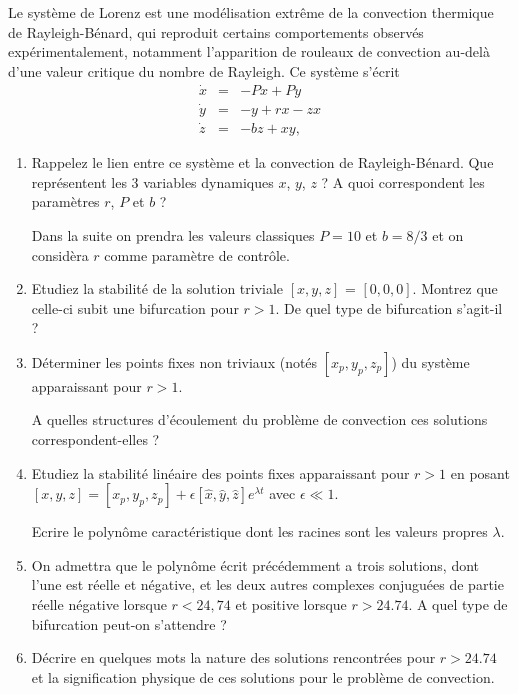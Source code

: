 \documentclass[a4paper,11pt]{article}
\begin{document}
Le système de Lorenz est une modélisation extrême de la convection thermique de Rayleigh-Bénard, qui reproduit certains comportements observés expérimentalement, notamment l'apparition de rouleaux de convection au-delà d'une valeur critique du nombre de Rayleigh. Ce système s'écrit
\begin{eqnarray*}
\dot{x} &=& - P x + P y \\
\dot{y} &=& - y + r x - z x  \\
\dot{z} &=& - b z + x y,
\end{eqnarray*}


\begin{enumerate}

\item Rappelez le lien entre ce système et la convection de Rayleigh-Bénard. Que représentent les 3 variables dynamiques $x$, $y$, $z$ ? A quoi correspondent les
paramètres $r$, $P$ et $b$ ?

Dans la suite on prendra les valeurs classiques $P = 10$ et $b = 8/3$ et on considèra $r$ comme paramètre de contrôle.

\item Etudiez la stabilité de la solution triviale $[x,y,z]$ = $[0,0,0]$. Montrez que celle-ci subit une bifurcation pour $r>1$. De quel type de bifurcation s'agit-il ?

\item Déterminer les points fixes non triviaux (notés $[x_p,y_p,z_p]$) du système apparaissant pour $r>1$. 

A quelles structures d'écoulement du problème de convection ces solutions correspondent-elles ?

\item Etudiez la stabilité linéaire des points fixes apparaissant pour $r>1$ en posant $[x,y,z] = [x_p,y_p,z_p] + \epsilon [\hat{x},\hat{y},\hat{z}] e^{\lambda t}$ 
avec $\epsilon \ll 1$.

Ecrire le polynôme caractéristique dont les racines sont les valeurs propres $\lambda$.

\item On admettra que le polynôme écrit précédemment a trois solutions, dont l'une est réelle et négative, et les deux autres complexes conjuguées de partie réelle négative lorsque $r < 24,74$ et positive lorsque $r>24.74$. 
A quel type de bifurcation peut-on s'attendre ?
   
\item Décrire en quelques mots la nature des solutions rencontrées pour $r>24.74$ et la signification physique de ces solutions pour le problème de convection.   

\end{enumerate}
\end{document}
